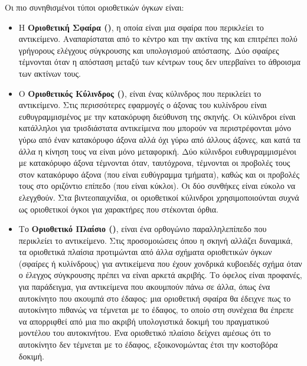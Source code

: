Οι πιο συνηθισμένοι τύποι οριοθετικών όγκων είναι:
\begin{itemize}
    \item Η \textbf{Οριοθετική Σφαίρα ()}, 
    η οποία είναι μια σφαίρα που περικλείει το αντικείμενο. 
    Αναπαρίσταται από το κέντρο και την ακτίνα της και 
    επιτρέπει πολύ γρήγορους ελέγχους σύγκρουσης και 
    υπολογισμού απόστασης. 
    Δύο σφαίρες τέμνονται όταν η απόσταση μεταξύ των κέντρων τους 
    δεν υπερβαίνει το άθροισμα των ακτίνων τους.

    \item Ο \textbf{Οριοθετικός Κύλινδρος ()}, 
    είναι ένας κύλινδρος που περικλείει το αντικείμενο. 
    Στις περισσότερες εφαρμογές ο άξονας του κυλίνδρου είναι 
    ευθυγραμμισμένος με την κατακόρυφη διεύθυνση της σκηνής.
    Οι κύλινδροι είναι κατάλληλοι για τρισδιάστατα αντικείμενα 
    που μπορούν να περιστρέφονται μόνο γύρω από έναν κατακόρυφο άξονα 
    αλλά όχι γύρω από άλλους άξονες, και κατά τα άλλα η κίνηση τους 
    να είναι μόνο μεταφορική. 
    Δύο κύλινδροι ευθυγραμμισμένοι με κατακόρυφο άξονα τέμνονται όταν, 
    ταυτόχρονα, τέμνονται οι προβολές τους στον κατακόρυφο άξονα (που είναι 
    ευθύγραμμα τμήματα), καθώς και οι προβολές τους 
    στο οριζόντιο επίπεδο (που είναι κύκλοι). 
    Οι δύο συνθήκες είναι εύκολο να ελεγχθούν. 
    Στα βιντεοπαιχνίδια, οι οριοθετικοί κύλινδροι χρησιμοποιούνται 
    συχνά ως οριοθετικοί όγκοι για χαρακτήρες που στέκονται όρθια.

    \item Το \textbf{Οριοθετικό Πλαίσιο ()}, είναι ένα 
    ορθογώνιο παραλληλεπίπεδο που περικλείει το αντικείμενο. 
    Στις προσομοιώσεις όπου η σκηνή αλλάζει δυναμικά, τα οριοθετικά πλαίσια
    προτιμώνται από άλλα σχήματα οριοθετικών όγκων (σφαίρες ή κυλίνδρους) 
    για αντικείμενα που έχουν χονδρικά κυβοειδές σχήμα
    όταν ο έλεγχος σύγκρουσης πρέπει να είναι αρκετά ακριβής.
    Το όφελος είναι προφανές, για παράδειγμα, για αντικείμενα 
    που ακουμπούν πάνω σε άλλα, όπως ένα αυτοκίνητο που ακουμπά 
    στο έδαφος: μια οριοθετική σφαίρα θα έδειχνε πως το αυτοκίνητο 
    πιθανώς να τέμνεται με το έδαφος, το οποίο στη συνέχεια θα έπρεπε 
    να απορριφθεί από μια πιο ακριβή υπολογιστικά δοκιμή του πραγματικού 
    μοντέλου του αυτοκινήτου. Ένα οριοθετικό πλαίσιο δείχνει αμέσως 
    ότι το αυτοκίνητο δεν τέμνεται με το έδαφος, 
    εξοικονομώντας έτσι την κοστοβόρα δοκιμή.


\end{itemize}
